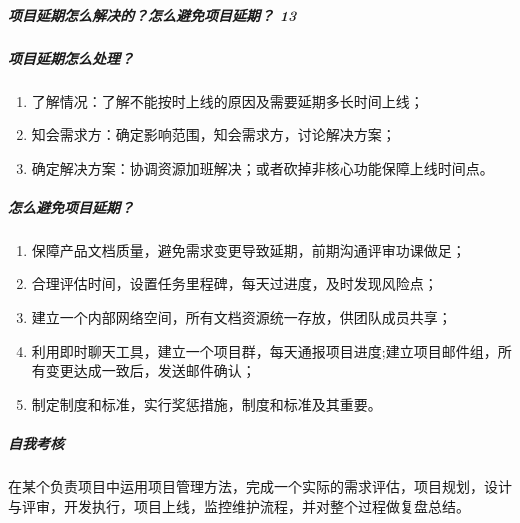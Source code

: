 \documentclass[letterpaper,10pt,english]{sphinxmanual}
\begin{document}
\subparagraph{项目延期怎么解决的？怎么避免项目延期？ 13\sphinxfootnotemark[657]}
\label{\detokenize{chapter_knowledge/project_manage:id13}}%
\begin{footnotetext}[657]\sphinxAtStartFootnote
{}
%
\end{footnotetext}\ignorespaces 

\subparagraph{项目延期怎么处理？}
\label{\detokenize{chapter_knowledge/project_manage:id14}}\begin{enumerate}
%
\item {} 
了解情况：了解不能按时上线的原因及需要延期多长时间上线；

\item {} 
知会需求方：确定影响范围，知会需求方，讨论解决方案；

\item {} 
确定解决方案：协调资源加班解决；或者砍掉非核心功能保障上线时间点。

\end{enumerate}


\subparagraph{怎么避免项目延期？}
\label{\detokenize{chapter_knowledge/project_manage:id15}}\begin{enumerate}
%
\item {} 
保障产品文档质量，避免需求变更导致延期，前期沟通评审功课做足；

\item {} 
合理评估时间，设置任务里程碑，每天过进度，及时发现风险点；

\item {} 
建立一个内部网络空间，所有文档资源统一存放，供团队成员共享；

\item {} 
利用即时聊天工具，建立一个项目群，每天通报项目进度;建立项目邮件组，所有变更达成一致后，发送邮件确认；

\item {} 
制定制度和标准，实行奖惩措施，制度和标准及其重要。

\end{enumerate}


\subparagraph{自我考核}
\label{\detokenize{chapter_knowledge/project_manage:id16}}
在某个负责项目中运用项目管理方法，完成一个实际的需求评估，项目规划，设计与评审，开发执行，项目上线，监控维护流程，并对整个过程做复盘总结。
\end{document}
